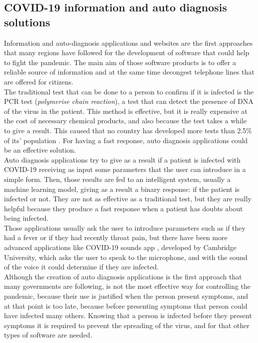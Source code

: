 \documentclass[a4paper, 12pt]{article}
\begin{document}
\subsection{COVID-19 information and auto diagnosis solutions}
\label{subsection:information-auto-diagnosis}

Information and auto-diagnosis applications and websites are the first approaches that many regions have followed for the development of software that could help to fight the pandemic. The main aim of those software products is to offer a reliable source of information and at the same time decongest telephone lines that are offered for citizens. \\

The traditional test that can be done to a person to confirm if it is infected is the PCR test (\textit{polymerise chain reaction}), a test that can detect the presence of DNA of the virus in the patient. This method is effective, but it is really expensive at the cost of necessary chemical products, and also because the test takes a while to give a result. This caused that no country has developed more tests than 2.5\% of its' population \cite{covid19-ml}. For having a fast response, auto diagnosis applications could be an effective solution.\\

Auto diagnosis applications try to give as a result if a patient is infected with COVID-19 receiving as input some parameters that the user can introduce in a simple form. Then, those results are fed to an intelligent system, usually a machine learning model, giving as a result a binary response: if the patient is infected or not. They are not as effective as a traditional test, but they are really helpful because they produce a fast response when a patient has doubts about being infected.\\

Those applications usually ask the user to introduce parameters such as if they had a fever or if they had recently throat pain, but there have been more advanced applications like COVID-19 sounds app \cite{covid19-cambridge}, developed by Cambridge University, which asks the user to speak to the microphone, and with the sound of the voice it could determine if they are infected. \\

Although the creation of auto diagnosis applications is the first approach that many governments are following, is not the most effective way for controlling the pandemic, because their use is justified when the person present symptoms, and at that point is too late, because before presenting symptoms that person could have infected many others. Knowing that a person is infected before they present symptoms it is required to prevent the spreading of the virus, and for that other types of software are needed.
\end{document}
